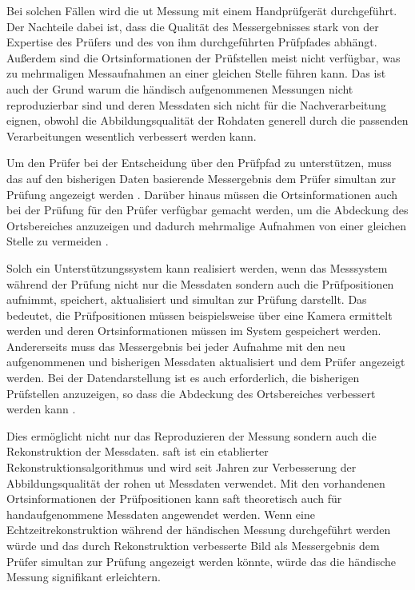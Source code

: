 Bei solchen Fällen wird die \acrshort{ut} Messung mit einem Handprüfgerät durchgeführt. Der Nachteile dabei ist, dass die Qualität des Messergebnisses stark von der Expertise des Prüfers und des von ihm durchgeführten Prüfpfades abhängt. Außerdem sind die Ortsinformationen der Prüfstellen meist nicht verfügbar, was zu mehrmaligen Messaufnahmen an einer gleichen Stelle führen kann. Das ist auch der Grund warum die händisch aufgenommenen Messungen nicht reproduzierbar sind und deren Messdaten sich nicht für die Nachverarbeitung eignen, obwohl die Abbildungsqualität der Rohdaten generell durch die passenden Verarbeitungen wesentlich verbessert werden kann. \par
Um den Prüfer bei der Entscheidung über den Prüfpfad zu unterstützen, muss das auf den bisherigen Daten basierende Messergebnis dem Prüfer simultan zur Prüfung angezeigt werden \cite{Krieg18SAFTwithSmartInspect}. Darüber hinaus müssen die Ortsinformationen auch bei der Prüfung für den Prüfer verfügbar gemacht werden, um die Abdeckung des Ortsbereiches anzuzeigen und dadurch mehrmalige Aufnahmen von einer gleichen Stelle zu vermeiden \cite{Krieg18SAFTwithSmartInspect}. \par
Solch ein Unterstützungssystem kann realisiert werden, wenn das Messsystem während der Prüfung nicht nur die Messdaten sondern auch die Prüfpositionen aufnimmt, speichert, aktualisiert und simultan zur Prüfung darstellt. Das bedeutet, die Prüfpositionen müssen beispielsweise über eine Kamera ermittelt werden und deren Ortsinformationen müssen im System gespeichert werden. Andererseits muss das Messergebnis bei jeder Aufnahme mit den neu aufgenommenen und bisherigen Messdaten aktualisiert und dem Prüfer angezeigt werden. Bei der Datendarstellung ist es auch erforderlich, die bisherigen Prüfstellen anzuzeigen, so dass die Abdeckung des Ortsbereiches verbessert werden kann \cite{Krieg18SAFTwithSmartInspect}. \par
Dies ermöglicht nicht nur das Reproduzieren der Messung sondern auch die Rekonstruktion der Messdaten. \acrfull{saft} ist ein etablierter Rekonstruktionsalgorithmus und wird seit Jahren zur Verbesserung der Abbildungsqualität der rohen \acrshort{ut} Messdaten verwendet. Mit den vorhandenen Ortsinformationen der Prüfpositionen kann \acrshort{saft} theoretisch auch für handaufgenommene Messdaten angewendet werden. Wenn eine Echtzeitrekonstruktion während der händischen Messung durchgeführt werden würde und das durch Rekonstruktion verbesserte Bild als Messergebnis dem Prüfer simultan zur Prüfung angezeigt werden könnte, würde das die händische Messung signifikant erleichtern.  \par
